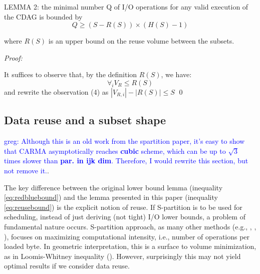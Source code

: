 \documentclass[sigconf]{acmart}
\newcommand\greg[1]{\textcolor{blue}{greg: #1}}
\begin{document}
LEMMA 2:
the minimal number Q of I/O operations for any valid execution of the CDAG 
is bounded by	
\begin{equation}
Q \ge (S - R(S)) \times (H(S) - 1)
	\label{eq:reusebound}
\end{equation}

where $R(S)$ is an upper bound on the reuse volume between the subsets.

\textit{Proof:}

It suffices to observe that, by the definition $R(S)$, we have:
$$\forall_{i} V_{R} \le R(S)$$
and rewrite the observation (4) as $|V_{R,i}| - |R(S)| \le S$ \qed


%	
%	
\subsection{Data reuse and a subset shape}
\label{sec:partitionShape}

\greg{Although this is an old work from the spartition paper, it's easy to show 
that CARMA asymptotically reaches \textbf{cubic} scheme, which can be up to 
$\sqrt{3}$ times slower than \textbf{par. in ijk dim}. Therefore, I would 
rewrite 
this section, but not remove it.}.

The key difference between the original lower bound lemma (inequality 
\ref{eq:redbluebound}) and the lemma presented in this paper (inequality 
\ref{eq:reusebound}) is the explicit notion of reuse. 
If S-partition is to be used for scheduling, instead of just deriving 
(not tight) I/O lower bounds, a problem of fundamental nature occurs.
S-partition approach, as many other methods (e.g., \cite{IronyMMM}, 
\cite{MMM_LW}, \cite{elangoSymbolic}), focuses on maximizing computational 
intensity, 
i.e., number of operations per loaded byte. In geometric interpretation, 
this is a surface to volume minimization, as in Loomis-Whitney inequality 
(\cite{loomisWhitney}). However, surprisingly this may not yield optimal 
results if we 
consider data reuse.
\end{document}
